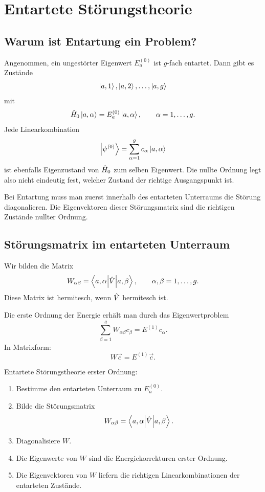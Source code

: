 \section{Entartete Störungstheorie}

\subsection{Warum ist Entartung ein Problem?}

Angenommen, ein ungestörter Eigenwert \(E_a^{(0)}\) ist \(g\)-fach entartet. Dann gibt es Zustände
\[
    \left|a,1\right\rangle,\left|a,2\right\rangle,\dots,\left|a,g\right\rangle
\]
mit
\[
    \hat H_0\left|a,\alpha\right\rangle=E_a^{(0)}\left|a,\alpha\right\rangle,
    \qquad \alpha=1,\dots,g.
\]
Jede Linearkombination
\[
    \left|\psi^{(0)}\right\rangle=\sum_{\alpha=1}^g c_\alpha\left|a,\alpha\right\rangle
\]
ist ebenfalls Eigenzustand von \(\hat H_0\) zum selben Eigenwert. Die nullte Ordnung legt also nicht eindeutig fest, welcher Zustand der richtige Ausgangspunkt ist.

\begin{conceptbox}
Bei Entartung muss man zuerst innerhalb des entarteten Unterraums die Störung diagonalieren. Die Eigenvektoren dieser Störungsmatrix sind die richtigen Zustände nullter Ordnung.
\end{conceptbox}

\subsection{Störungsmatrix im entarteten Unterraum}

Wir bilden die Matrix
\[
    W_{\alpha\beta}=\left\langle a,\alpha\middle|\hat V\middle|a,\beta\right\rangle,
    \qquad \alpha,\beta=1,\dots,g.
\]
Diese Matrix ist hermitesch, wenn \(\hat V\) hermitesch ist.

Die erste Ordnung der Energie erhält man durch das Eigenwertproblem
\[
    \sum_{\beta=1}^g W_{\alpha\beta}c_\beta
    =E^{(1)}c_\alpha.
\]
In Matrixform:
\[
    W\vec c=E^{(1)}\vec c.
\]

\begin{formulabox}
Entartete Störungstheorie erster Ordnung:
\begin{enumerate}
    \item Bestimme den entarteten Unterraum zu \(E_a^{(0)}\).
    \item Bilde die Störungsmatrix
    \[
        W_{\alpha\beta}=\left\langle a,\alpha\middle|\hat V\middle|a,\beta\right\rangle.
    \]
    \item Diagonalisiere \(W\).
    \item Die Eigenwerte von \(W\) sind die Energiekorrekturen erster Ordnung.
    \item Die Eigenvektoren von \(W\) liefern die richtigen Linearkombinationen der entarteten Zustände.
\end{enumerate}
\end{formulabox}

